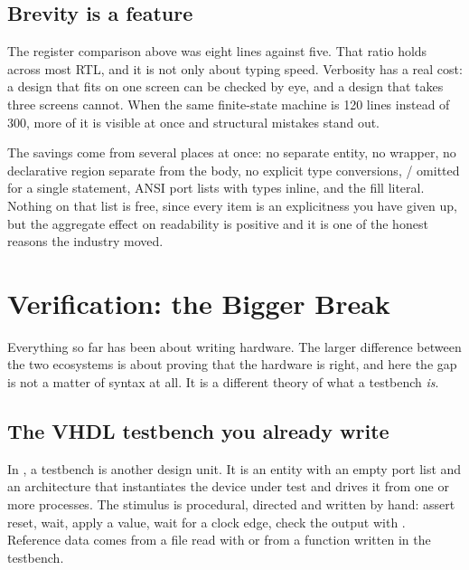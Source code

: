 \subsection{Brevity is a feature}

The register comparison above was eight lines against five. That ratio holds
across most RTL, and it is not only about typing speed. Verbosity has a real
cost: a design that fits on one screen can be checked by eye, and a design that
takes three screens cannot. When the same finite-state machine is 120 lines
instead of 300, more of it is visible at once and structural mistakes stand
out.

The savings come from several places at once: no separate entity, no
 wrapper, no declarative region separate from the body, no
explicit type conversions, / omitted for a single
statement, ANSI port lists with types inline, and the  fill literal.
Nothing on that list is free, since every item is an explicitness you have
given up, but the aggregate effect on readability is positive and it is one of
the honest reasons the industry moved.

\section{Verification: the Bigger Break}
\label{sec:philosophy:verif}

Everything so far has been about writing hardware. The larger difference
between the two ecosystems is about proving that the hardware is right, and
here the gap is not a matter of syntax at all. It is a different theory of what
a testbench \emph{is}.

\subsection{The VHDL testbench you already write}

In \VHDL{}, a testbench is another design unit. It is an
entity with an empty port list and an architecture that instantiates the device
under test and drives it from one or more processes. The stimulus is
procedural, directed and written by hand: assert reset, wait, apply a value,
wait for a clock edge, check the output with . Reference data comes from a file read with  or from
a function written in the testbench.

